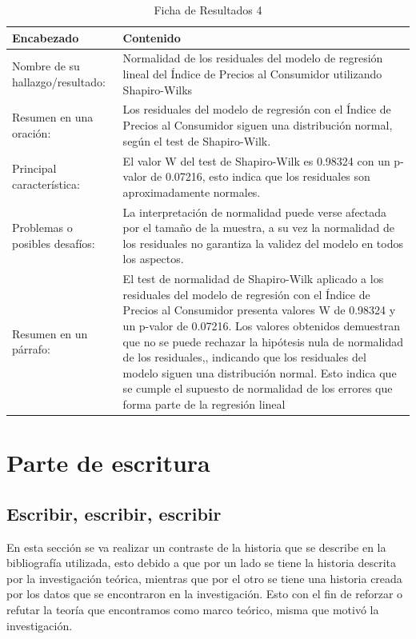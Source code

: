 \begin{table}[H]
    \caption{Ficha de Resultados 4}
    \begin{center}
        \begin{tabular}{  m{3cm} | m{12cm}  }
        \hline
        \textbf{ Encabezado} & \textbf{Contenido }\\ 
        \hline
        Nombre de su hallazgo/resultado: & Normalidad de los residuales del modelo de regresión lineal del Índice de Precios al Consumidor utilizando Shapiro-Wilks\\ 
        \hline
        Resumen en una oración: & Los residuales del modelo de regresión con el Índice de Precios al Consumidor siguen una distribución normal, según el test de Shapiro-Wilk.\\ 
        \hline
        Principal característica: & El valor W del test de Shapiro-Wilk es 0.98324 con un p-valor de 0.07216, esto indica que los residuales son aproximadamente normales.\\ 
        \hline
        Problemas o posibles desafíos: & La interpretación de normalidad puede verse afectada por el tamaño de la muestra, a su vez la normalidad de los residuales no garantiza la validez del modelo en todos los aspectos.\\ 
        \hline
        Resumen en un párrafo: & El test de normalidad de Shapiro-Wilk aplicado a los residuales del modelo de regresión con el Índice de Precios al Consumidor presenta valores W de 0.98324 y un p-valor de 0.07216. Los valores obtenidos demuestran que no se puede rechazar la hipótesis nula de normalidad de los residuales,, indicando que los residuales del modelo siguen una distribución normal. Esto indica que se cumple el supuesto de normalidad de los errores que forma parte de la regresión lineal\\ 
        \hline
        \end{tabular}
    \end{center}
\end{table}
\pagebreak

\section{Parte de escritura}
\subsection{Escribir, escribir, escribir}

En esta sección se va realizar un contraste de la historia que se describe en la bibliografía utilizada, esto debido a que por un lado se tiene la historia descrita por la investigación teórica, mientras que por el otro se tiene una historia creada por los datos que se encontraron en la investigación. Esto con el fin de reforzar o refutar la teoría que encontramos como marco teórico, misma que motivó la investigación.\\

